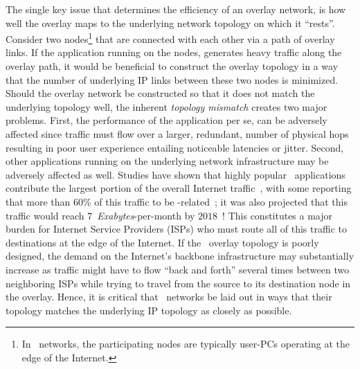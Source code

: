 The single key issue that determines the efficiency of an overlay network,
is how well the overlay maps to the underlying network topology on which it
``rests''. 
Consider two nodes\footnote{In \p\ networks,
the participating nodes are typically user-PCs operating at the edge of the
Internet.} that are connected with each other via a path of overlay links.
If the application running on the nodes, generates heavy traffic along
the overlay path, it would be beneficial to
construct the overlay topology in a way that the number of 
underlying IP links between these two nodes is minimized.
Should the overlay network be constructed so that
it does not match the underlying topology well, 
the inherent \emph{topology mismatch} creates two
major problems. 
First, the performance of the application per se, can be
adversely affected since traffic must flow over a larger,
redundant, number of physical hops resulting in poor user experience 
entailing noticeable latencies or jitter. 
Second, other applications running
on the underlying network infrastructure may be adversely affected as well.
Studies have shown that highly popular \p\ applications contribute 
the largest portion of the overall 
Internet traffic~\cite{seroiu_analysiscds_2002,sen_analyzep2ptraffic_2004,krp_ispfear_2005}, with some reporting that more than $60$\% of this traffic 
to be \p-related~\cite{cachelogic,ipoque2009};
it was also projected that this traffic would reach
$7$~\emph{Exabytes}-per-month by $2018$~\cite{CVNI2014}! 
This constitutes a major burden for 
Internet Service Providers (ISPs) who must route 
all of this traffic to destinations at the edge of the Internet. 
If the \p\ overlay topology is poorly designed, 
the demand on the Internet's backbone infrastructure may 
substantially increase as traffic might have to flow
``back and forth'' several times between two neighboring ISPs
while trying to travel from the source to its destination node
in the overlay.
Hence, it is critical that \p\ networks be laid out 
in ways that their topology matches the underlying IP topology as 
closely as possible.

